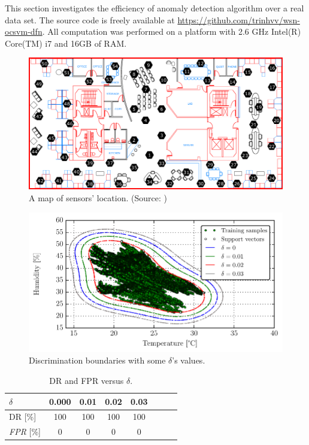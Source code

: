 \documentclass[conference]{IEEEtran}
\theoremstyle{problemstyle}
\begin{document}
This section investigates the efficiency of anomaly detection algorithm over a real data set. The source code is freely available at \url{https://github.com/trinhvv/wsn-ocsvm-dfn}. All computation was performed on a platform with 2.6 GHz Intel(R) Core(TM) i7 and 16GB of RAM.

\begin{figure}[H]
\centering
\includegraphics[scale=.25]{Figs/ibrl_wsn.png}
\caption{A map of sensors' location. (Source: \cite{Buonadonna2005})}
\label{fig:sensor_map}
\end{figure}

\begin{figure}[H]
\centering
\includegraphics[scale=.6]{Python/data_description.pdf}
\caption{Discrimination boundaries with some $\delta$'s values. }
\label{fig:domain_boundary}
\end{figure}

\begin{table}[H]
\centering
\begin{tabular}{lccccccc}
\toprule
$\delta$ & 0.000 & 0.01 & 0.02 & 0.03 \\\midrule[\lightrulewidth]
DR [\%] & 100 & 100 & 100 & 100 \\
\emph{FPR} [\%] & 0 & 0 & 0 & 0 \\\bottomrule
\end{tabular}
\caption{DR and FPR versus $\delta$.}
\label{table:delta_eval}
\end{table}
\end{document}
